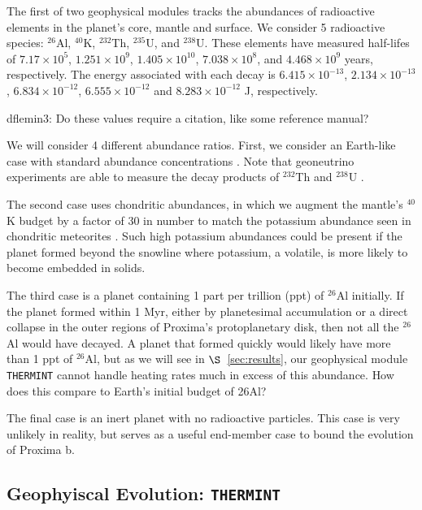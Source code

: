 \documentclass[preprint,12pt]{aastex}
\newcommand{\xxx}[1]{{\color{red} #1}} %
\def\eg{{\it e.g.\ }}
\def\thermint{\texttt{\footnotesize{THERMINT}}\xspace}
\begin{document}
The first of two geophysical modules tracks the abundances of
radioactive elements in the planet's core, mantle and surface. We
consider 5 radioactive species: $^{26}$Al, $^{40}$K, $^{232}$Th,
$^{235}$U, and $^{238}$U. These elements have measured half-lifes of
$7.17 \times 10^5$, $1.251 \times 10^9$, $1.405 \times 10^{10}$,
$7.038 \times 10^8$, and $4.468 \times 10^9$ years, respectively. The
energy associated with each decay is $6.415 \times 10^{-13}$,
$2.134 \times 10^{-13}$, $6.834 \times 10^{-12}$,
$6.555 \times 10^{-12}$ and $8.283 \times 10^{-12}$ J, respectively.

\xxx{dflemin3: Do these values require a citation, like some reference manual?}

We will consider 4 different abundance ratios. First, we consider an
Earth-like case with standard abundance concentrations
\citep[\eg][]{Korenaga03,Arevalo09,Huang13}. Note that geoneutrino
experiments are able to measure the decay products of $^{232}$Th and
$^{238}$U \citep{Raghavan98,Araki05,Dye10}.

The second case uses chondritic abundances, in which we augment the
mantle's $^{40}$K budget by a factor of 30 in number to match the
potassium abundance seen in chondritic meteorites
\citep{AndersGrevesse89,Arevalo09}. Such high potassium abundances could be
present if the planet formed beyond the snowline where potassium, a
volatile, is more likely to become embedded in solids.

The third case is a planet containing 1 part per trillion (ppt) of
$^{26}$Al initially. If the planet formed within 1 Myr, either by
planetesimal accumulation or a direct collapse in the outer regions of
Proxima's protoplanetary disk, then not all the $^{26}$Al would have
decayed. A planet that formed quickly would likely have more than 1
ppt of $^{26}$Al, but as we will see in $\S$~\ref{sec:results}, our
geophysical module \thermint cannot handle heating rates much in
excess of this abundance. \xxx{How does this compare to Earth's 
initial budget of 26Al?}

The final case is an inert planet with no radioactive particles. This
case is very unlikely in reality, but serves as a useful end-member
case to bound the evolution of Proxima b.

\subsection{Geophyiscal Evolution: \thermint}
\label{sec:models:thermint}
\end{document}
